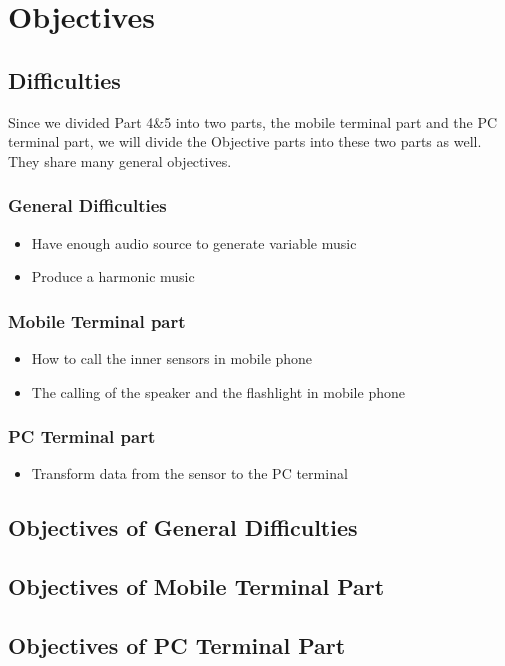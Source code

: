 \section{Objectives}
\subsection{Difficulties}
\hspace*{2em}Since we divided Part 4\&5 into two parts, the mobile terminal part
and the PC terminal part, we will divide the Objective parts into these two
parts as well. They share many general objectives. 

\subsubsection{General Difficulties}
\begin{itemize}
\item Have enough audio source to generate variable music
\item Produce a harmonic music
\end{itemize}

\subsubsection{Mobile Terminal part}
\begin{itemize}
\item How to call the inner sensors in mobile phone
\item The calling of the speaker and the flashlight in mobile phone 
\end{itemize}

\subsubsection{PC Terminal part}
\begin{itemize}
\item Transform data from the sensor to the PC terminal
\end{itemize}



\subsection{Objectives of General Difficulties}
\subsection{Objectives of Mobile Terminal Part}
\subsection{Objectives of PC Terminal Part}
